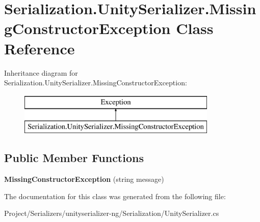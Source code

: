 \hypertarget{class_serialization_1_1_unity_serializer_1_1_missing_constructor_exception}{}\section{Serialization.\+Unity\+Serializer.\+Missing\+Constructor\+Exception Class Reference}
\label{class_serialization_1_1_unity_serializer_1_1_missing_constructor_exception}
Inheritance diagram for Serialization.\+Unity\+Serializer.\+Missing\+Constructor\+Exception\+:\begin{figure}[H]
\begin{center}
\leavevmode
\includegraphics[height=2.000000cm]{class_serialization_1_1_unity_serializer_1_1_missing_constructor_exception}
\end{center}
\end{figure}
\subsection*{Public Member Functions}
\begin{DoxyCompactItemize}
\item 
\mbox{\label{class_serialization_1_1_unity_serializer_1_1_missing_constructor_exception_abe6acc36e1c08845f4c41e3aecb243b9}} 
{\bfseries Missing\+Constructor\+Exception} (string message)
\end{DoxyCompactItemize}


The documentation for this class was generated from the following file\+:\begin{DoxyCompactItemize}
\item 
Project/\+Serializers/unityserializer-\/ng/\+Serialization/Unity\+Serializer.\+cs\end{DoxyCompactItemize}
